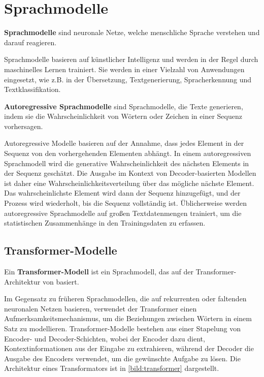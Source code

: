 \section{Sprachmodelle}\label{sec:sprachmodelle}

\begin{definition}\label{def:sprachmodell}
   \textbf{Sprachmodelle} sind neuronale Netze, welche menschliche Sprache verstehen und darauf reagieren.
\end{definition}
Sprachmodelle basieren auf künstlicher Intelligenz und werden in der Regel durch maschinelles Lernen trainiert.
Sie werden in einer Vielzahl von Anwendungen eingesetzt, wie z.B. in der Übersetzung,
Textgenerierung, Spracherkennung und Textklassifikation.

\begin{definition}\label{def:autoregressive-sprachmodelle}
    \textbf{Autoregressive Sprachmodelle} sind Sprachmodelle, die Texte generieren,
    indem sie die Wahrscheinlichkeit von Wörtern oder Zeichen in einer Sequenz vorhersagen.
\end{definition}

Autoregressive Modelle basieren auf der Annahme, dass jedes Element in der Sequenz von den vorhergehenden Elementen abhängt.
In einem autoregressiven Sprachmodell wird die generative Wahrscheinlichkeit des nächsten Elements in der Sequenz geschätzt.
Die Ausgabe im Kontext von Decoder-basierten Modellen ist daher eine Wahrscheinlichkeitsverteilung über das mögliche nächste Element.
Das wahrscheinlichste Element wird dann der Sequenz hinzugefügt, und der Prozess wird wiederholt, bis die Sequenz vollständig ist.
Üblicherweise werden autoregressive Sprachmodelle auf großen Textdatenmengen trainiert, um die statistischen Zusammenhänge in den Trainingsdaten zu erfassen.

\subsection{Transformer-Modelle}\label{sec:grundlagen:transformer}

\begin{definition}\label{def:transformer-modell}
    Ein \textbf{Transformer-Modell} ist ein Sprachmodell, das auf der Transformer-Architektur von \citet{attention} basiert.
\end{definition}
Im Gegensatz zu früheren Sprachmodellen, die auf rekurrenten oder faltenden neuronalen Netzen basieren, verwendet der Transformer einen Aufmerksamkeitsmechanismus, um die Beziehungen zwischen Wörtern in einem Satz zu modellieren.
Transformer-Modelle bestehen aus einer Stapelung von Encoder- und Decoder-Schichten, wobei der Encoder dazu dient, Kontextinformationen aus der Eingabe zu extrahieren,
während der Decoder die Ausgabe des Encoders verwendet, um die gewünschte Aufgabe zu lösen.
Die Architektur eines Transformators ist in \cref{bild:transformer} dargestellt.\\

